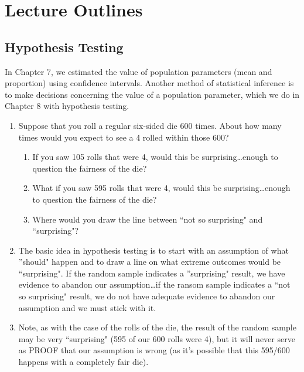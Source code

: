 \documentclass{ccg-topic}
\begin{document}
\newpage
\section{Lecture Outlines}
\subsection*{Hypothesis Testing}

In Chapter 7, we estimated the value of population parameters (mean and proportion) using confidence intervals. Another method of statistical inference is to make decisions concerning the value of a population parameter, which we do in Chapter 8 with hypothesis testing.

\begin{enumerate}

  \item Suppose that you roll a regular six-sided die 600 times. About how many times would you expect to see a 4 rolled within those 600?
    
    \begin{enumerate}
    
      \item If you saw 105 rolls that were 4, would this be surprising\ldots enough to question the fairness of the die?

      \item What if you saw 595 rolls that were 4, would this be surprising\ldots enough to question the fairness of the die?

      \item Where would you draw the line between ``not so surprising" and ``surprising"?
      
    \end{enumerate}
    
  \item The basic idea in hypothesis testing is to start with an assumption of what ''should" happen and to draw a line on what extreme outcomes would be ``surprising". If the random sample indicates a ''surprising" result, we have evidence to abandon our assumption\ldots if the ransom sample indicates a ``not so surprising" result, we do not have adequate evidence to abandon our assumption and we must stick with it.
  
  \item Note, as with the case of the rolls of the die, the result of the random sample may be very ``surprising" (595 of our 600 rolls were 4), but it will never serve as PROOF that our assumption is wrong (as it's possible that this 595/600 happens with a completely fair die).
  
\end{enumerate}
\end{document}
